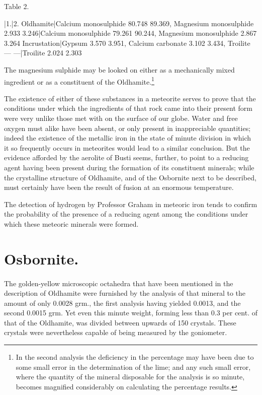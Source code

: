 \documentclass[a4paper, 12pt, oneside]{article}
\begin{document}
Table 2.

|1.|2.  
Oldhamite|{Calcium monosulphide 80.748 89.369, Magnesium monosulphide 2.933 3.246}|{Calcium monosulphide 79.261 90.244, Magnesium monosulphide 2.867 3.264}  
Incrustation|{Gypsum 3.570 3.951, Calcium carbonate 3.102 3.434, Troilite --- ---}|{Troilite 2.024 2.303}  

The magnesium sulphide may be looked on either as a mechanically mixed ingredient or as a constituent of the Oldhamite.\footnote{In the second analysis the deficiency in the percentage may have been due to some small error in the determination of the lime; and any such small error, where the quantity of the mineral disposable for the analysis is so minute, becomes magnified considerably on calculating the percentage results.}

The existence of either of these substances in a meteorite serves to prove that the conditions under which the ingredients of that rock came into their present form were very unlike those met with on the surface of our globe. Water and free oxygen must alike have been absent, or only present in inappreciable quantities; indeed the existence of the metallic iron in the state of minute division in which it so frequently occurs in meteorites would lead to a similar conclusion. But the evidence afforded by the aerolite of Busti seems, further, to point to a reducing agent having been present during the formation of its constituent minerals; while the crystalline structure of Oldhamite, and of the Osbornite next to be described, must certainly have been the result of fusion at an enormous temperature.

The detection of hydrogen by Professor Graham in meteoric iron tends to confirm the probability of the presence of a reducing agent among the conditions under which these meteoric minerals were formed.
\clearpage
\section{Osbornite.}
\paragraph{}
The golden-yellow microscopic octahedra that have been mentioned in the description of Oldhamite were furnished by the analysis of that mineral to the amount of only 0.0028 grm., the first analysis having yielded 0.0013, and the second 0.0015 grm. Yet even this minute weight, forming less than 0.3 per cent. of that of the Oldhamite, was divided between upwards of 150 crystals. These crystals were nevertheless capable of being measured by the goniometer.
\end{document}
